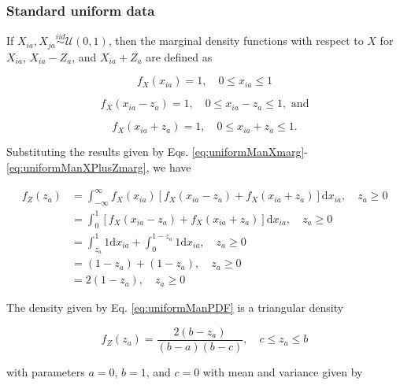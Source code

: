\documentclass[10pt,letterpaper]{article}\usepackage[]{graphicx}\usepackage[]{color}
\begin{document}
\subsubsection{Standard uniform data}

If $X_{ia},X_{ja} \overset{iid}{\sim} \mathcal{U}(0,1)$, then the marginal density functions with respect to $X$ for $X_{ia}$, $X_{ia} - Z_a$, and $X_{ia} + Z_a$ are defined as

\begin{equation}\label{eq:uniformManXmarg}
f_X(x_{ia}) = 1, \quad 0 \leq x_{ia} \leq 1
\end{equation}

\begin{equation}\label{eq:uniformManXMinusZmarg}
f_X(x_{ia} - z_a) = 1, \quad 0 \leq x_{ia} - z_a \leq 1, \text{ and}
\end{equation}

\begin{equation}\label{eq:uniformManXPlusZmarg}
f_X(x_{ia} + z_a) = 1, \quad 0 \leq x_{ia} + z_a \leq 1.
\end{equation}

Substituting the results given by Eqs. \ref{eq:uniformManXmarg}-\ref{eq:uniformManXPlusZmarg}, we have

\begin{equation}\label{eq:uniformManPDF}
\begin{aligned}
f_Z(z_a) &= \int_{-\infty}^{\infty}f_X(x_{ia})[f_X(x_{ia} - z_a) + f_X(x_{ia} + z_a)]\text{d}x_{ia}, \quad z_a \geq 0 \\
&= \int_{0}^{1}[f_X(x_{ia} - z_a) + f_X(x_{ia} + z_a)]\text{d}x_{ia}, \quad z_a \geq 0 \\
&= \int_{z_a}^{1}1\text{d}x_{ia} + \int_{0}^{1 - z_a}1\text{d}x_{ia}, \quad z_a \geq 0 \\
&= (1 - z_a) + (1 - z_a), \quad z_a \geq 0 \\
&= 2(1 - z_a), \quad z_a \geq 0
\end{aligned}
\end{equation}

The density given by Eq. \ref{eq:uniformManPDF} is a triangular density 

\begin{equation}\label{eq:triangle}
f_Z(z_a) = \frac{2(b - z_a)}{(b - a)(b - c)}, \quad c \leq z_a \leq b 
\end{equation}

\noindent with parameters $a = 0$, $b = 1$, and $c = 0$ with mean and variance given by
\end{document}
